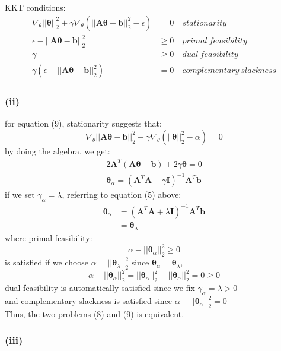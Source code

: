 \documentclass[11pt]{article}
\begin{document}
KKT conditions:\\
\begin{equation}
\begin{aligned}
\nabla_\theta||\pmb{\theta}||^2_2+\gamma\nabla_\theta(||\pmb{A\theta}-\pmb{b}||^2_2-\epsilon)&=0 &\ stationarity\\
\epsilon-||\pmb{A\theta}-\pmb{b}||^2_2&\ge 0 &\ primal\ feasibility\\
\gamma&\ge 0 &\ dual\ feasibility\\
\gamma(\epsilon-||\pmb{A\theta}-\pmb{b}||^2_2)&=0 &\ complementary\ slackness
\end{aligned}
\end{equation}

\subsubsection*{(ii)}
for equation (9), stationarity suggests that:
\begin{equation}
\nabla_\theta||\pmb{A\theta}-\pmb{b}||^2_2+\gamma\nabla_\theta(||\pmb{\theta}||^2_2-\alpha)=0
\end{equation}
by doing the algebra, we get:
\begin{equation}
\begin{split}
2\pmb{A}^T(\pmb{A\theta}-\pmb{b})+2\gamma\pmb{\theta}=0\\
\pmb{\theta}_\alpha=(\pmb{A}^T\pmb{A}+\gamma\pmb{I})^{-1}\pmb{A}^T\pmb{b}
\end{split}
\end{equation}
if we set $\gamma_\alpha=\lambda$, referring to equation (5) above:\\
\begin{equation}
\begin{split}
\pmb{\theta}_\alpha&=(\pmb{A}^T\pmb{A}+\lambda\pmb{I})^{-1}\pmb{A}^T\pmb{b}\\
&=\pmb{\theta}_\lambda
\end{split}
\end{equation}
where primal feasibility:
$$\alpha-||\pmb{\theta}_\alpha||^2_2\ge 0$$
is satisfied if we choose $\alpha = ||\pmb{\theta}_\lambda||^2_2$ since $\pmb{\theta}_\alpha = \pmb{\theta}_\lambda$,\\
	$$\alpha-||\pmb{\theta}_\alpha||^2_2=||\pmb{\theta}_\alpha||^2_2-||\pmb{\theta}_\alpha||^2_2=0\ge0$$
dual feasibility is automatically satisfied since we fix $\gamma_\alpha=\lambda>0$\\
and complementary slackness is satisfied since 	$\alpha-||\pmb{\theta}_\alpha||^2_2=0$\\

Thus, the two problems (8) and (9) is equivalent.
\subsubsection*{(iii)}
\end{document}
